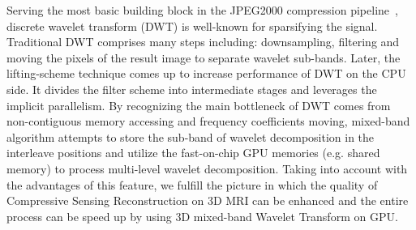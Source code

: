 
Serving the most basic building block in the JPEG2000 compression pipeline~\cite{skodras_jpeg_2001}, discrete wavelet transform (DWT) is well-known for sparsifying the signal. 
Traditional DWT comprises many steps including: downsampling, filtering and moving the pixels of the result image to separate wavelet sub-bands. 
Later, the lifting-scheme technique comes up to increase performance of DWT on the CPU side. 
It divides the filter scheme into intermediate stages and leverages the implicit parallelism. 
By recognizing the main bottleneck of DWT comes from non-contiguous memory accessing and frequency coefficients moving, mixed-band algorithm attempts to store the sub-band of wavelet decomposition in the interleave positions and utilize the fast-on-chip GPU memories (e.g. shared memory) to process multi-level wavelet decomposition.
Taking into account with the advantages of this feature, we fulfill the picture in which the quality of Compressive Sensing Reconstruction on 3D MRI can be enhanced and the entire process can be speed up by using 3D mixed-band Wavelet Transform on GPU.

